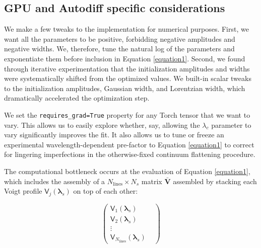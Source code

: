 \documentclass[modern]{aastex631}
\begin{document}
\subsection{GPU and Autodiff specific considerations}
We make a few tweaks to the implementation for numerical purposes. First, we want all the parameters to be positive, forbidding negative amplitudes and negative widths. We, therefore, tune the natural log of the parameters and exponentiate them before inclusion in Equation \ref{equation1}. Second, we found through iterative experimentation that the initialization amplitudes and widths were systematically shifted from the optimized values. We built-in scalar tweaks to the initialization amplitudes, Gaussian width, and Lorentzian width, which dramatically accelerated the optimization step.

We set the \texttt{requires\_grad=True} property for any Torch tensor that we want to vary. This allows us to easily explore whether, say, allowing the $\lambda_c$ parameter to vary significantly improves the fit. It also allows us to tune or freeze an experimental wavelength-dependent pre-factor to Equation \ref{equation1} to correct for lingering imperfections in the otherwise-fixed continuum flattening procedure.

The computational bottleneck occurs at the evaluation of Equation \ref{equation1}, which includes the assembly of a $N_{\mathrm{lines}}\times N_{s}$ matrix $\bm{\bar{V}}$ assembled by stacking each Voigt profile $\mathsf{V}_j(\bm{\lambda}_s)$ on top of each other:

\begin{equation}
 \begin{pmatrix}
 \mathsf{V}_1(\bm{\lambda}_s) & \\
 \mathsf{V}_2(\bm{\lambda}_s) & \\
 \vdots & \\
 \mathsf{V}_{N_{\mathrm{lines}}}(\bm{\lambda}_s) &
 \end{pmatrix}
\end{equation}
\end{document}
